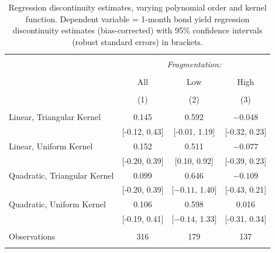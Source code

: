 \documentclass[12pt]{article}
\begin{document}
\begin{appendices}
	\begin{table}[h] \centering 
		\caption{Regression discontinuity estimates, varying polynomial order and kernel function. Dependent variable = 1-month bond yield regression discontinuity estimates (bias-corrected) with 95\% confidence intervals (robust standard errors) in brackets.} 
		\label{table:RDQuadratic} 
		\begin{tabular}{@{\extracolsep{5pt}}lccc} 
			\\[-1.8ex]\hline 
			\hline \\[-1.8ex] 
			& \multicolumn{3}{c}{\textit{Fragmentation:}} \\ 
			\cline{2-4} 
			\\[-1.8ex] & All & Low & High \\ 
			\\[-1.8ex] & (1) & (2) & (3)\\ 
			\hline \\[-1.8ex] 	
			Linear, Triangular Kernel & 0.145 & 0.592 & $-0.048$ \\ 
			& [-0.12, 0.43] & [-0.01, 1.19] & [-0.32, 0.23] \\ 
			Linear, Uniform Kernel & 0.152 & 0.511 & $-0.077$ \\ 
			& [-0.20, 0.39] & [0.10, 0.92] & [-0.39, 0.23] \\ 
			Quadratic, Triangular Kernel & 0.099 & 0.646 & $-0.109$ \\ 
			& [-0.20, 0.39] & [$-0.11$, 1.40] & [-0.43, 0.21] \\ 
			Quadratic, Uniform Kernel & 0.106 & 0.598 & 0.016 \\ 
			& [-0.19, 0.41] & [$-0.14$, 1.33] & [-0.31, 0.34] \\ 
			\hline \\[-1.8ex] 
			Observations & 316 & 179 & 137 \\ 
			\hline 
			\hline \\[-1.8ex] 
		\end{tabular} 
	\end{table}  

\end{appendices}
\end{document}
